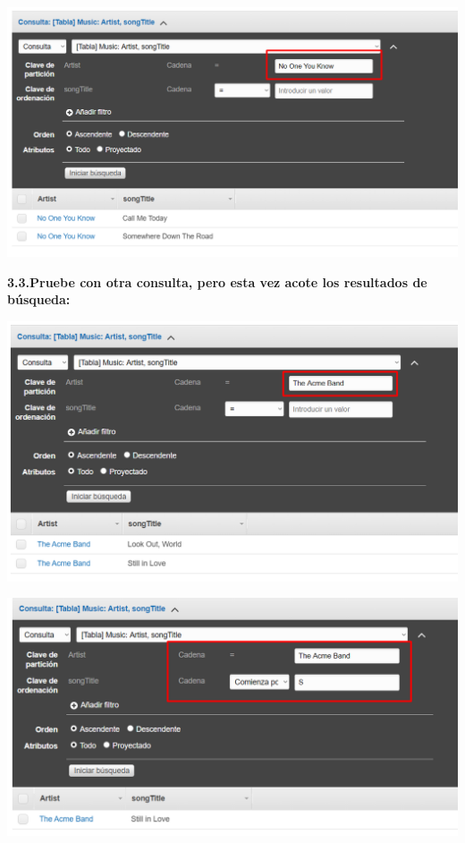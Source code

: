 \documentclass{article}
\begin{document}
    \begin{center}
		\includegraphics[width=15cm]{./images/11} 
	\end{center}
	\newpage
\textbf{3.3.Pruebe con otra consulta, pero esta vez acote los resultados de búsqueda:
}

    \begin{center}
		\includegraphics[width=15cm]{./images/12} 
	\end{center}
	\begin{center}
		\includegraphics[width=15cm]{./images/13} 
	\end{center}
\end{document}
